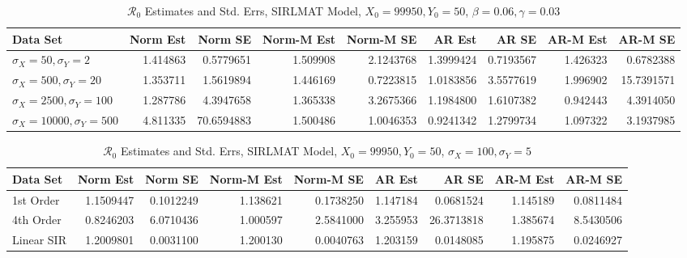 \documentclass[12pt]{article}
\newcommand{\rr}{\ensuremath{\mathcal{R}_0}}
\begin{document}
\begin{table}[H]
	
	\caption{\label{tab:}$\rr$ Estimates and Std. Errs, SIRLMAT Model,
		$X_0 = 99950, Y_0 = 50$, $\beta = 0.06, \gamma = 0.03$}
	\centering
	\begin{footnotesize}
		\begin{tabular}[t]{l|r|r|r|r|r|r|r|r}
			\hline
			Data Set & Norm Est & Norm SE & Norm-M Est & Norm-M SE & AR Est & AR SE & AR-M Est & AR-M SE\\
			\hline
			$\sigma_X = 50, \sigma_Y = 2$ & 1.414863 & 0.5779651 & 1.509908 & 2.1243768 & 1.3999424 & 0.7193567 & 1.426323 & 0.6782388\\
			\hline
			$\sigma_X = 500, \sigma_Y = 20$ & 1.353711 & 1.5619894 & 1.446169 & 0.7223815 & 1.0183856 & 3.5577619 & 1.996902 & 15.7391571\\
			\hline
			$\sigma_X = 2500, \sigma_Y = 100$ & 1.287786 & 4.3947658 & 1.365338 & 3.2675366 & 1.1984800 & 1.6107382 & 0.942443 & 4.3914050\\
			\hline
			$\sigma_X = 10000, \sigma_Y = 500$ & 4.811335 & 70.6594883 & 1.500486 & 1.0046353 & 0.9241342 & 1.2799734 & 1.097322 & 3.1937985\\
			\hline
		\end{tabular}
	\end{footnotesize}
\end{table}

\begin{table}[H]
	
	\caption{\label{tab:}$\rr$ Estimates and Std. Errs, SIRLMAT Model,
		$X_0 = 99950, Y_0 = 50$, $\sigma_X = 100, \sigma_Y = 5$}
	\centering
	\begin{footnotesize}
		\begin{tabular}[t]{l|r|r|r|r|r|r|r|r}
			\hline
			Data Set & Norm Est & Norm SE & Norm-M Est & Norm-M SE & AR Est & AR SE & AR-M Est & AR-M SE\\
			\hline
			1st Order & 1.1509447 & 0.1012249 & 1.138621 & 0.1738250 & 1.147184 & 0.0681524 & 1.145189 & 0.0811484\\
			\hline
			4th Order & 0.8246203 & 6.0710436 & 1.000597 & 2.5841000 & 3.255953 & 26.3713818 & 1.385674 & 8.5430506\\
			\hline
			Linear SIR & 1.2009801 & 0.0031100 & 1.200130 & 0.0040763 & 1.203159 & 0.0148085 & 1.195875 & 0.0246927\\
			\hline
		\end{tabular}
	\end{footnotesize}
\end{table}
\end{document}
